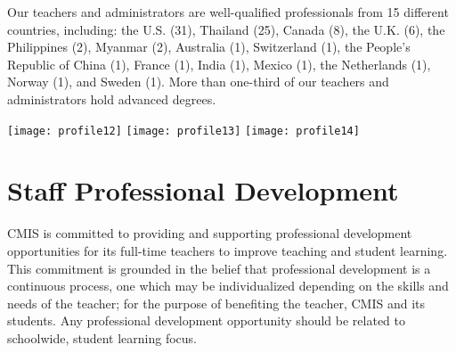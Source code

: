 

Our teachers and administrators are well-qualified professionals from 15 different countries, including:  the U.S. (31), Thailand (25), Canada (8), the U.K. (6), the Philippines (2), Myanmar (2), Australia (1), Switzerland (1), the People’s Republic of China (1), France (1), India (1), Mexico (1), the Netherlands (1), Norway (1), and Sweden (1).  More than one-third of our teachers and administrators hold advanced degrees.

\texttt{[image: profile12]}
\texttt{[image: profile13]}
\texttt{[image: profile14]}

\section{Staff Professional Development}

CMIS is committed to providing and supporting professional development opportunities for its full-time teachers to improve teaching and student learning. This commitment is grounded in the belief that professional development is a continuous process, one which may be individualized depending on the skills and needs of the teacher; for the purpose of benefiting the teacher, CMIS and its students.  Any professional development opportunity should be related to schoolwide, student learning focus. 

